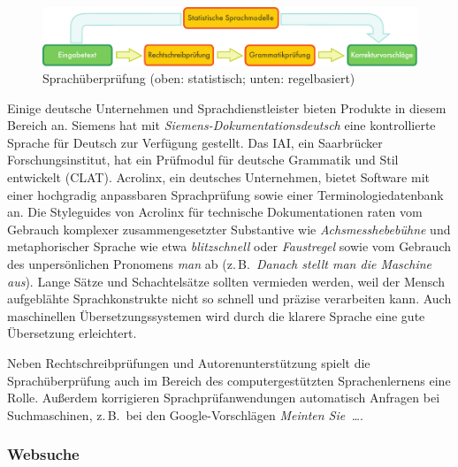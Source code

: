 \begin{multicols}{2}
\begin{figure}[htb]
  \center
  \includegraphics[width=\textwidth]{../_media/german/language_checking}
  \caption{Sprachüberprüfung (oben: statistisch; unten: regelbasiert)}
  \label{fig:langcheckingaarch_de}
\end{figure}

Einige deutsche Unternehmen und Sprachdienstleister bieten Produkte in diesem Bereich an. Siemens hat mit \textit{Sie\-mens-Do\-ku\-men\-ta\-tions\-deutsch} eine kontrollierte Sprache für Deutsch zur Verfügung gestellt. Das IAI, ein Saarbrücker Forschungsinstitut, hat ein Prüfmodul für deutsche Grammatik und Stil entwickelt (CLAT). Acrolinx, ein deutsches Unternehmen, bietet Software mit einer hochgradig anpassbaren Sprachprüfung sowie einer Terminologiedatenbank an. Die Styleguides von Acrolinx für technische Dokumentationen raten vom Gebrauch komplexer zusammengesetzter Substantive wie \textit{Achsmesshebebühne} und metaphorischer Sprache wie etwa \textit{blitzschnell} oder \textit{Faustregel} sowie vom Gebrauch des unpersönlichen Pronomens \textit{man} ab (z.\,B.~\textit{Danach stellt man die Maschine aus}). Lange Sätze und Schachtelsätze sollten vermieden werden, weil der Mensch aufgeblähte Sprachkonstrukte nicht so schnell und präzise verarbeiten kann. Auch maschinellen Übersetzungssystemen wird 
durch die klarere Sprache eine gute Übersetzung erleichtert.


Neben Rechtschreibprüfungen und Autorenunterstützung spielt die Sprachüberprüfung auch im Bereich des computergestützten Sprachenlernens eine Rolle. Außerdem korrigieren Sprachprüfanwendungen automatisch Anfragen bei Suchmaschinen, z.\,B.~bei den Google-Vor\-schlägen \textit{Meinten Sie~\dots}.

\subsubsection{Websuche}


\end{multicols}
